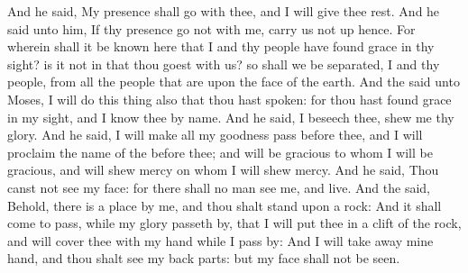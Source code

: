 \begin{biblechapter}
\verse And he said, My presence shall go with thee, and I will give thee rest.
\verse And he said unto him, If thy presence go not with me, carry us not up hence.
\verse For wherein shall it be known here that I and thy people have found grace in thy sight? is it not in that thou goest with us? so shall we be separated, I and thy people, from all the people that are upon the face of the earth.
\verse And the \LORD said unto Moses, I will do this thing also that thou hast spoken: for thou hast found grace in my sight, and I know thee by name.
\verse And he said, I beseech thee, shew me thy glory.
\verse And he said, I will make all my goodness pass before thee, and I will proclaim the name of the \LORD before thee; and will be gracious to whom I will be gracious, and will shew mercy on whom I will shew mercy.
\verse And he said, Thou canst not see my face: for there shall no man see me, and live.
\verse And the \LORD said, Behold, there is a place by me, and thou shalt stand upon a rock:
\verse And it shall come to pass, while my glory passeth by, that I will put thee in a clift of the rock, and will cover thee with my hand while I pass by:
\verse And I will take away mine hand, and thou shalt see my back parts: but my face shall not be seen.
\end{biblechapter}

